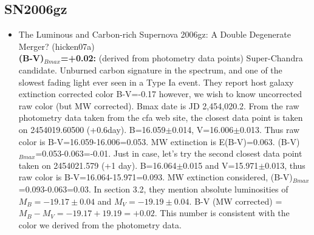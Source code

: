 \subsection{\bf SN2006gz}
\begin{itemize}
\item The Luminous and Carbon-rich Supernova 2006gz: A Double Degenerate Merger?
(hicken07a) \citet{hicken07a}\\
{\bf (B-V)$_{Bmax}$=+0.02:} (derived from photometry data points)
Super-Chandra candidate.  Unburned carbon signature in the spectrum, and one of
the slowest fading light ever seen in a Type Ia event.
They report host galaxy extinction corrected color B-V=-0.17 however, we wish to
know uncorrected raw color (but MW corrected).
Bmax date is JD 2,454,020.2.  From the raw photometry data taken from the cfa
web site, the closest data point is taken on 2454019.60500 (+0.6day).  
B=16.059$\pm$0.014, V=16.006$\pm$0.013.  Thus raw color is B-V=16.059-16.006=0.053.
MW extinction is E(B-V)=0.063.  (B-V)$_{Bmax}$=0.053-0.063=-0.01.
Just in case, let's try the second closest data point taken on 2454021.579 (+1 day).
B=16.064$\pm$0.015 and V=15.971$\pm$0.013, thus raw color is B-V=16.064-15.971=0.093.
MW extinction considered, (B-V)$_{Bmax}$=0.093-0.063=0.03.
In section 3.2, they mention absolute luminosities of $M_{B}=-19.17\pm0.04$ and
$M_{V}=-19.19\pm0.04$.  B-V (MW corrected) = $M_{B}-M_{V}=-19.17+19.19=+0.02$. This
number is consistent with the color we derived from the photometry data.




\end{itemize}
